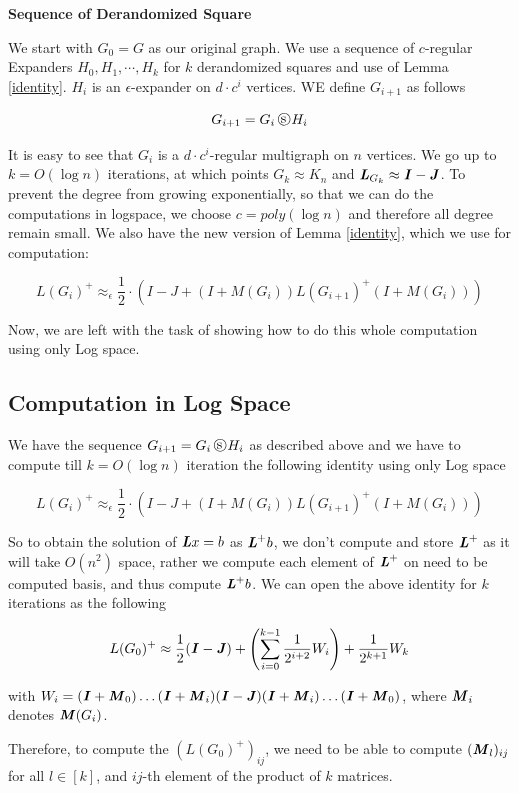 \documentclass{article}
\begin{document}
\textbf{Sequence of Derandomized Square}

We start with $G_0=G$ as our original graph. We use a sequence of $c$-regular Expanders $H_0,H_1,\cdots,H_k$ for $k$ derandomized squares and use of Lemma \ref{identity}. $H_i$ is an $\epsilon$-expander on $d\cdot c^{i}$ vertices. WE define $G_{i+1}$ as follows

$$G_{i+1}=G_i\dsquare H_{i}$$

It is easy to see that $G_{i}$ is a $d\cdot c^{i}$-regular multigraph on $n$ vertices. We go up to $k=O(\log n)$ iterations, at which points $G_k\approx K_n$ and $\boldsymbol{\mathit{L}}_{G_k}\approx \boldsymbol{\mathit{I}}-\boldsymbol{\mathit{J}}$. To prevent the degree from growing exponentially, so that we can do the computations in logspace, we choose $c=poly(\log n)$ and therefore all degree remain small. We also have the new version of Lemma \ref{identity}, which we use for computation:

$$L(G_{i})^+\approx_{\epsilon}\frac{1}{2}\cdot(I-J+(I+M(G_i))L(G_{i+1})^+(I+M(G_i)))$$

Now, we are left with the task of showing how to do this whole computation using only Log space.

\subsection{Computation in Log Space}

We have the sequence $G_{i+1}=G_i\dsquare H_{i}$ as described above and we have to compute till $k=O(\log n)$ iteration the following identity using only Log space

$$L(G_{i})^+\approx_{\epsilon}\frac{1}{2}\cdot(I-J+(I+M(G_i))L(G_{i+1})^+(I+M(G_i)))$$

So to obtain the solution of $\boldsymbol{\mathit{L}} x=b$ as $\boldsymbol{\mathit{L}}^+b$, we don't compute and store $\boldsymbol{\mathit{L}}^+$ as it will take $O(n^2)$ space, rather we compute each element of $\boldsymbol{\mathit{L}}^+$ on need to be computed basis, and thus compute $\boldsymbol{\mathit{L}}^+b$. We can open the above identity for $k$ iterations as the following


$$L(G_0)^+\approx\frac{1}{2}(\boldsymbol{\mathit{I}}-\boldsymbol{\mathit{J}})+\left(\sum_{i=0}^{k-1}\frac{1}{2^{i+2}}W_i\right)+\frac{1}{2^{k+1}}W_k$$
       
with $W_i=(\boldsymbol{\mathit{I}}+\boldsymbol{\mathit{M}}_0)\ldots(\boldsymbol{\mathit{I}}+\boldsymbol{\mathit{M}}_i)(\boldsymbol{\mathit{I}}-\boldsymbol{\mathit{J}})(\boldsymbol{\mathit{I}}+\boldsymbol{\mathit{M}}_i)\ldots(\boldsymbol{\mathit{I}}+\boldsymbol{\mathit{M}}_0)$, where $\boldsymbol{\mathit{M}}_i$ denotes $\boldsymbol{\mathit{M}}(G_i)$.

Therefore, to compute the $(L(G_0)^+)_{ij}$, we need to be able to compute $(\boldsymbol{\mathit{M}}_l)_{ij}$ for all $l\in[k]$, and $ij$-th element of the product of $k$ matrices.
\end{document}
